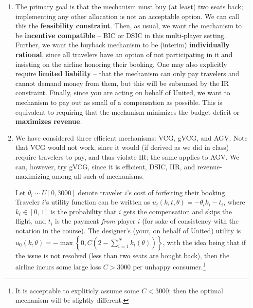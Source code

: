 \documentclass[a4paper]{article}
\begin{document}
\begin{enumerate}
	\item The primary goal is that the mechanism must buy (at least) two seats back; implementing any other allocation is not an acceptable option. We can call this the \textbf{feasibility constraint}. Then, as usual, we want the mechanism to be \textbf{incentive compatible} -- BIC or DSIC in this multi-player setting. Further, we want the buyback mechanism to be (interim) \textbf{individually rational}, since all travelers have an option of not participating in it and insisting on the airline honoring their booking. One may also explicitly require \textbf{limited liability} -- that the mechanism can only pay travelers and cannot demand money from them, but this will be subsumed by the IR constraint. Finally, since you are acting on behalf of United, we want to mechanism to pay out as small of a compensation as possible. This is equivalent to requiring that the mechanism minimizes the budget deficit or \textbf{maximizes revenue}.
	
	\item We have considered three efficient mechanisms: VCG, gVCG, and AGV. Note that VCG would not work, since it would (if derived as we did in class) require travelers to pay, and thus violate IR; the same applies to AGV. We can, however, try gVCG, since it is efficient, DSIC, IIR, and revenue-maximizing among all such of mechanisms.
	
	Let $\theta_i \sim U[0, 3000]$ denote traveler $i$'s cost of forfeiting their booking. Traveler $i$'s utility function can be written as $u_i(k,t,\theta) = -\theta_i k_i - t_i$, where $k_i \in [0,1]$ is the probability that $i$ gets the compensation and skips the flight, and $t_i$ is the payment \emph{from} player $i$ (for sake of consistency with the notation in the course). The designer's (your, on behalf of United) utility is $u_0(k,\theta) = - \max \left\{0, C \left( 2 - \sum_{i=1}^N k_i(\theta) \right) \right\}$, with the idea being that if the issue is not resolved (less than two seats are bought back), then the airline incurs some large loss $C > 3000$ per unhappy consumer.\footnote{It is acceptable to expliticly assume some $C < 3000$; then the optimal mechanism will be slightly different.}
	

\end{enumerate}
\end{document}
